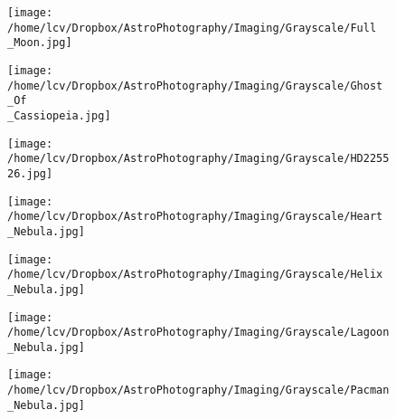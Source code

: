 \newpage
\begin{figure}[phbt]
	\texttt{[image: /home/lcv/Dropbox/AstroPhotography/Imaging/Grayscale/Full\\\_Moon.jpg]}


\end{figure}
\newpage
\begin{figure}[phbt]
	\texttt{[image: /home/lcv/Dropbox/AstroPhotography/Imaging/Grayscale/Ghost\\\_Of\\\_Cassiopeia.jpg]}


\end{figure}
\newpage
\begin{figure}[phbt]
	\texttt{[image: /home/lcv/Dropbox/AstroPhotography/Imaging/Grayscale/HD225526.jpg]}


\end{figure}
\newpage
\begin{figure}[phbt]
	\texttt{[image: /home/lcv/Dropbox/AstroPhotography/Imaging/Grayscale/Heart\\\_Nebula.jpg]}


\end{figure}
\newpage
\begin{figure}[phbt]
	\texttt{[image: /home/lcv/Dropbox/AstroPhotography/Imaging/Grayscale/Helix\\\_Nebula.jpg]}


\end{figure}
\newpage
\begin{figure}[phbt]
	\texttt{[image: /home/lcv/Dropbox/AstroPhotography/Imaging/Grayscale/Lagoon\\\_Nebula.jpg]}


\end{figure}
\newpage
\begin{figure}[phbt]
	\texttt{[image: /home/lcv/Dropbox/AstroPhotography/Imaging/Grayscale/Pacman\\\_Nebula.jpg]}


\end{figure}
